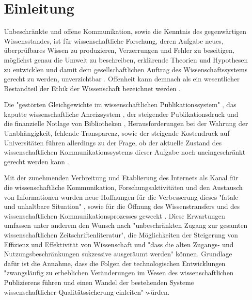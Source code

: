 \chapter{Einleitung}

Unbeschränkte und offene Kommunikation, sowie die Kenntnis des gegenwärtigen Wissensstandes, ist für wissenschaftliche Forschung, deren Aufgabe neues, überprüfbares Wissen zu produzieren, Verzerrungen und Fehler zu beseitigen, möglichst genau die Umwelt zu beschreiben, erklärende Theorien und Hypothesen zu entwicklen und damit dem gesellschaftlichen Auftrag des Wissenschaftssystems gerecht zu werden, unverzichtbar \cite{bbaw_publizieren_2015} \cite{Luescher_2014} \cite{Hanekop_2014} \cite{graefen2007_wissenschaftliche_artikel} \cite{glaeser2006} \cite{Luhmann1998} \cite{gibbons_1994}. Offenheit kann demnach als ein wesentlicher Bestandteil der Ethik der Wissenschaft bezeichnet werden \cite{Peters_2014} \cite{resnik_2005_ethics}.

Die "gestörten Gleichgewichte im wissenschaftlichen Publikationssystem" \cite{cite:0}, das kaputte wissenschaftliche Anreizsystem \cite{Brembs_2013_a}, der steigender Publikationsdruck und die finanzielle Notlage von Bibliotheken \cite{CREATe_2014}, Herausforderungen bei der Wahrung der Unabhängigkeit, fehlende Transparenz, sowie der steigende Kostendruck auf Universitäten \cite{bauer2006} führen allerdings zu der Frage, ob der aktuelle Zustand des wissenschaftlichen Kommunikationssystems dieser Aufgabe noch uneingeschränkt gerecht werden kann \cite{Schekman_2013}.

Mit der zunehmenden Verbreitung und Etablierung des Internets als Kanal für die wissenschaftliche Kommunikation, Forschungsaktivitäten und den Austausch von Informationen wurden neue Hoffnungen für die Verbesserung dieses "fatale und unhaltbare Situation" \cite{brembs2015open}, sowie für die Öffnung des Wissenstransfers \cite{schulze_2013_open} \cite{albert_2006_open_implications} und des wissenschaftlichen Kommunikationsprozesses geweckt \cite{Hanekop_2014} \cite{EuropeanCommission_sciencepub_2006} \cite{Goodrum_2001} \cite{Lawrence_1999}. Diese Erwartungen umfassen unter anderem den Wunsch nach "unbeschränkten Zugang zur gesamten wissenschaftlichen Zeitschriftenliteratur", die Möglichkeiten der Steigerung von Effizienz und Effektivität von Wissenschaft \cite{Partha_1994_economics_science} und "dass die alten Zugangs- und Nutzungsbeschränkungen sukzessive ausgeräumt werden" \cite{boai_2002} können. Grundlage dafür ist die Annahme, dass die Folgen der technologischen Entwicklungen "zwangsläufig zu erheblichen Veränderungen im Wesen des wissenschaftlichen Publizierens führen und einen Wandel der bestehenden Systeme wissenschaftlicher Qualitätssicherung einleiten" \cite{berliner_erklaerung_2003} würden.

